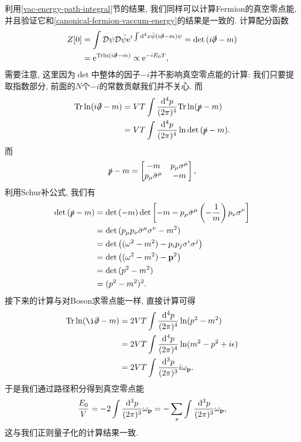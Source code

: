 \begin{example}
    利用\ref{vac-energy-path-integral}节的结果, 我们同样可以计算Fermion的真空零点能, 并且验证它和\eqref{canonical-fermion-vaccum-energy}的结果是一致的. 计算配分函数
    \begin{align}
        Z[0]&=\int\mathcal D\psi\mathcal D\bar\psi\exp{i\int\d^4x\bar\psi(i\slashed\partial-m)\psi}=\det{(i\slashed\partial-m)}\notag\\
        &=\exp{\Tr{\ln(i\slashed\partial-m)}}\propto\exp{-iE_0T},
    \end{align}
    需要注意, 这里因为$\det$中整体的因子$-i$并不影响真空零点能的计算: 我们只要提取指数部分, 前面的$N$个$-i$的常数贡献我们并不关心. 而
    \begin{align}
        \Tr\ln(i\slashed\partial-m)&=VT\int\dddd p\Tr\ln(\slashed p-m)\\
        &=VT\int\dddd p\ln\det{(\slashed p-m)}.
    \end{align}
    而
    \begin{align}
        \slashed p-m=\begin{bmatrix}
            -m & p_\mu\sigma^\mu\\
            p_\mu\bar\sigma^\mu & -m
        \end{bmatrix},
    \end{align}
    利用Schur补公式, 我们有
    \begin{align}
        \det{(\slashed p-m)}&=\det{(-m)}\det{\left[-m-p_\mu\bar\sigma^\mu\left(-\frac1m\right)p_\nu\sigma^\nu\right]}\\
        &=\det{(p_\mu p_\nu\bar\sigma^\mu\sigma^\nu-m^2)}\\
        &=\det{\left((\omega^2-m^2)-p_ip_j\sigma^i\sigma^j\right)}\\
        &=\det{\left((\omega^2-m^2)-\vec p^2\right)}\\
        &=\det{(p^2-m^2)}\\
        &=(p^2-m^2)^2.
    \end{align}
    接下来的计算与对Boson求零点能一样, 直接计算可得
    \begin{align}
        \Tr\ln(\i\slashed\partial-m)&=2VT\int\dddd p\ln(p^2-m^2)\\
        &=2VT\int\dddd p\ln(m^2-p^2+i\epsilon)\\
        &=2VT\int\ddd p i\om p.
    \end{align}
    于是我们通过路径积分得到真空零点能
    \begin{align}
        \frac{E_0}{V}=-2\int\ddd p\om p=-\sum_s\int\ddd p\om p,
    \end{align}
    这与我们正则量子化的计算结果一致.
\end{example}

